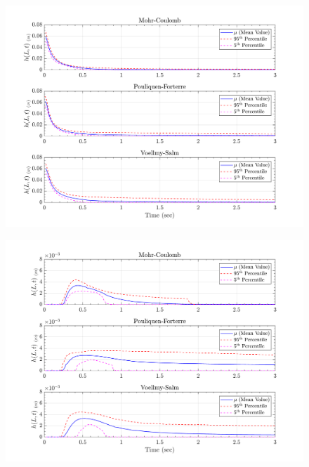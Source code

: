 \documentclass{article}
\begin{document}
\begin{figure}[H]
	\begin{minipage}[b]{0.5\linewidth}
    	\centering
    	\includegraphics[width=1\textwidth]{InclinedPlane/LocalRecords/Records/H_L1.png}
    	\label{fig:Ramp-L1-H}
	\end{minipage}
	\begin{minipage}[b]{0.5\linewidth}
		\centering
		\includegraphics[width=1\textwidth]{InclinedPlane/LocalRecords/Records/H_L8.png}
    	\label{fig:Ramp-L2-H}
    \end{minipage}
    

\end{figure}
\end{document}
